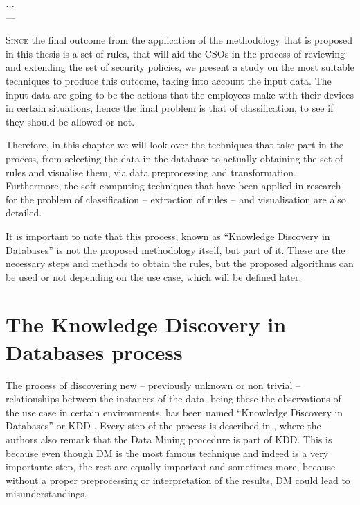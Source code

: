 \label{chap:softc} 

\begin{flushright}{\slshape
    ...} \\ \medskip
    --- {}
\end{flushright}

\minitoc\mtcskip
\vfill

\lettrine{S}{ince} the final outcome from the application of the methodology that is proposed in this thesis is a set of rules, that will aid the CSOs in the process of reviewing and extending the set of security policies, we present a study on the most suitable techniques to produce this outcome, taking into account the input data. The input data are going to be the actions that the employees make with their devices in certain situations, hence the final problem is that of classification, to see if they should be allowed or not.

Therefore, in this chapter we will look over the techniques that take part in the process, from selecting the data in the database to actually obtaining the set of rules and visualise them, via data preprocessing and transformation. Furthermore, the soft computing techniques that have been applied in research for the problem of classification -- extraction of rules -- and visualisation are also detailed.

It is important to note that this process, known as ``Knowledge Discovery in Databases'' is not the proposed methodology itself, but part of it. These are the necessary steps and methods to obtain the rules, but the proposed algorithms can be used or not depending on the use case, which will be defined later.

\section{The Knowledge Discovery in Databases process}

The process of discovering new -- previously unknown or non trivial -- relationships between the instances of the data, being these the observations of the use case in certain environments, has been named ``Knowledge Discovery in Databases'' or KDD \cite{fayyad1996data}. Every step of the process is described in \cite{fayyad1996data}, where the authors also remark that the Data Mining procedure is part of KDD. This is because even though DM is the most famous technique and indeed is a very importante step, the rest are equally important and sometimes more, because without a proper preprocessing or interpretation of the results, DM could lead to misunderstandings.


